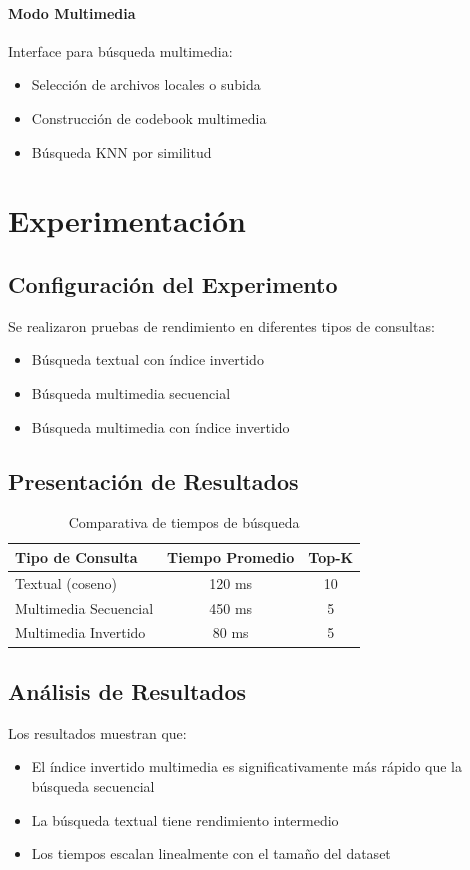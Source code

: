\documentclass[a4paper,12pt]{report}
\begin{document}
\subsubsection{Modo Multimedia}
Interface para búsqueda multimedia:
\begin{itemize}
\item Selección de archivos locales o subida
\item Construcción de codebook multimedia
\item Búsqueda KNN por similitud
\end{itemize}

\chapter{Experimentación}
\section{Configuración del Experimento}
Se realizaron pruebas de rendimiento en diferentes tipos de consultas:
\begin{itemize}
\item Búsqueda textual con índice invertido
\item Búsqueda multimedia secuencial
\item Búsqueda multimedia con índice invertido
\end{itemize}

\section{Presentación de Resultados}
\begin{table}[H]
\centering
\begin{tabular}{lcc}
\toprule
Tipo de Consulta & Tiempo Promedio & Top-K \\
\midrule
Textual (coseno) & 120 ms & 10 \\
Multimedia Secuencial & 450 ms & 5 \\
Multimedia Invertido & 80 ms & 5 \\
\bottomrule
\end{tabular}
\caption{Comparativa de tiempos de búsqueda}
\end{table}

\section{Análisis de Resultados}
Los resultados muestran que:
\begin{itemize}
\item El índice invertido multimedia es significativamente más rápido que la búsqueda secuencial
\item La búsqueda textual tiene rendimiento intermedio
\item Los tiempos escalan linealmente con el tamaño del dataset
\end{itemize}
\end{document}
